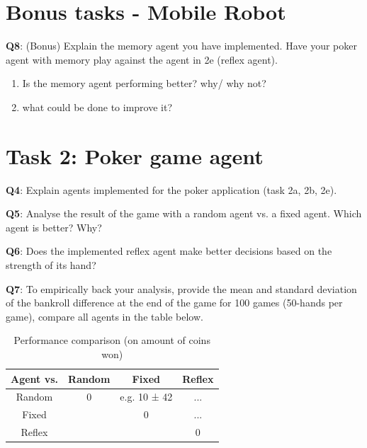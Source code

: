 \documentclass{article}
\begin{document}
\section*{Bonus tasks - Mobile Robot}

\begin{tcolorbox}
\textbf{Q8}: (Bonus) Explain the memory agent you have implemented. Have your poker agent with memory play against the agent in 2e (reflex agent).  
        
        \begin{enumerate}
            \item Is the memory agent performing better? why/ why not?
            \item what could be done to improve it?
        \end{enumerate}
\end{tcolorbox}

\section*{Task 2: Poker game agent}

\begin{tcolorbox}
\textbf{Q4}: Explain agents implemented for the poker application (task 2a, 2b, 2e).
\end{tcolorbox}


\begin{tcolorbox}
\textbf{Q5}: Analyse the result of the game with a random agent vs. a fixed agent. Which agent is better? Why?
\end{tcolorbox}

\begin{tcolorbox}
\textbf{Q6}: Does the implemented reflex agent make better decisions based on the strength of its hand?
\end{tcolorbox}

\begin{tcolorbox}
\textbf{Q7}: To empirically back your analysis, provide the mean and standard deviation of the bankroll difference at the end of the game for 100 games (50-hands per game), compare all agents in the table below.
\end{tcolorbox}

\begin{table}[h]
\vspace{1cm}
\begin{center}
\begin{tabular}{cccc}
\toprule
 Agent vs. & Random & Fixed  & Reflex \\ \midrule
Random & 0 &  e.g. 10 ± 42 & ...   \\
Fixed & & 0 & ... \\
Reflex &  &  & 0 \\
\bottomrule
\end{tabular}
\end{center}
\caption{Performance comparison (on amount of coins won)}
\label{tab:comparison}
\end{table}
\end{document}
